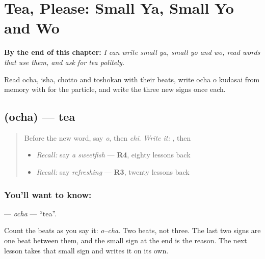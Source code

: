 
\chapter{Tea, Please: Small Ya, Small Yo and Wo}
\label{ch:ja-tea-please-small-ya-small-yo-wo}

\begin{chapteropening}
\textbf{By the end of this chapter:} \emph{I can write small ya, small yo and wo, read words that use them, and ask for tea politely.}

Read ocha, isha, chotto and toshokan with their beats, write ocha o kudasai from memory with  for the particle, and write the three new signs once each.
\end{chapteropening}

\section[\texorpdfstring{\ja{おちゃ} (ocha)}{おちゃ (ocha)}]{ (ocha) — tea}

\label{lesson:JA-C131-ocha}



\begin{quote}
Before the new word, say \emph{o}, then \emph{chi}. \emph{Write it:} \textbf{}, then \textbf{}

\begin{itemize}
\raggedright
  \item \emph{Recall:} say \emph{a sweetfish} — \textbf{R4}, eighty lessons back
  \item \emph{Recall:} say \emph{refreshing} — \textbf{R3}, twenty lessons back
\end{itemize}
\end{quote}

\subsection*{You'll want to know: }
\textbf{} — \emph{ocha} — \textquotedblleft{}tea\textquotedblright{}.

Count the beats as you say it: \emph{o–cha}. Two beats, not three. The last two signs are one beat between them, and the small sign at the end is the reason. The next lesson takes that small sign and writes it on its own.

